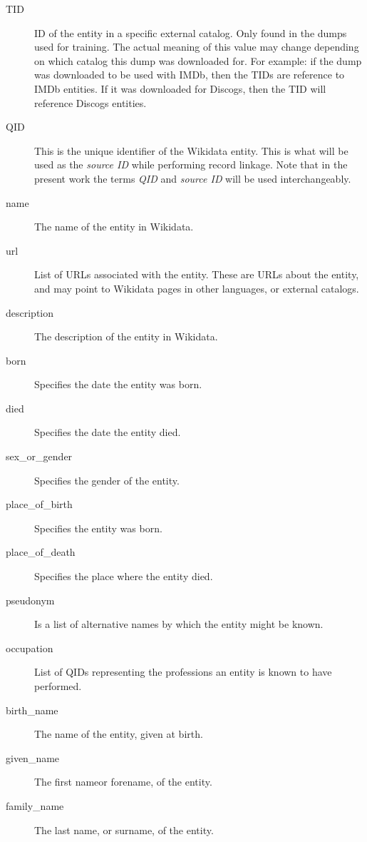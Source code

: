 \documentclass[epsfig,a4paper,11pt,titlepage,twoside,openany]{book}
\begin{document}
\begin{description}

\item[TID] ID of the entity in a specific external catalog. Only found in the dumps used for training. The actual meaning of this value may change depending on which catalog this dump was downloaded for. For example: if the dump was downloaded to be used with IMDb, then the TIDs are reference to IMDb entities. If it was downloaded for Discogs, then the TID will reference Discogs entities. 

\item[QID] This is the unique identifier of the Wikidata entity. This is what will be used as the \textit{source ID} while performing record linkage. Note that in the present work the terms \textit{QID} and \textit{source ID} will be used interchangeably.

\item[name] The name of the entity in Wikidata.

\item[url] List of URLs associated with the entity. These are URLs about the entity, and may point to Wikidata pages in other languages, or external catalogs.

\item[description] The description of the entity in Wikidata.

\item[born] Specifies the date the entity was born.

\item[died] Specifies the date the entity died.

\item[sex\_or\_gender] Specifies the gender of the entity.

\item[place\_of\_birth] Specifies the entity was born.

\item[place\_of\_death] Specifies the place where the entity died.

\item[pseudonym] Is a list of alternative names by which the entity might be known.

\item[occupation] List of QIDs representing the professions an entity is known to have performed.

\item[birth\_name] The name of the entity, given at birth.

\item[given\_name] The first nameor forename, of the entity.

\item[family\_name] The last name, or surname, of the entity.
\end{description}
\end{document}
